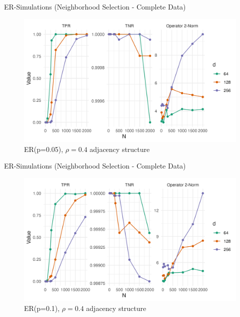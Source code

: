 \documentclass{beamer}
\begin{document}
\begin{frame}{ER-Simulations (Neighborhood Selection - Complete Data)}
    \begin{figure}
        \centering 
        \includegraphics[scale=0.65]{glasso_complete_ERmb_FixN_05.png}
        \caption{ER(p=0.05), $\rho=0.4$ adjacency structure}
    \end{figure}
\end{frame}


\begin{frame}{ER-Simulations (Neighborhood Selection - Complete Data)}
    \begin{figure}
        \centering 
        \includegraphics[scale=0.65]{glasso_complete_ERmb_FixN_1.png}
        \caption{ER(p=0.1), $\rho=0.4$ adjacency structure}
    \end{figure}
\end{frame}
\end{document}
